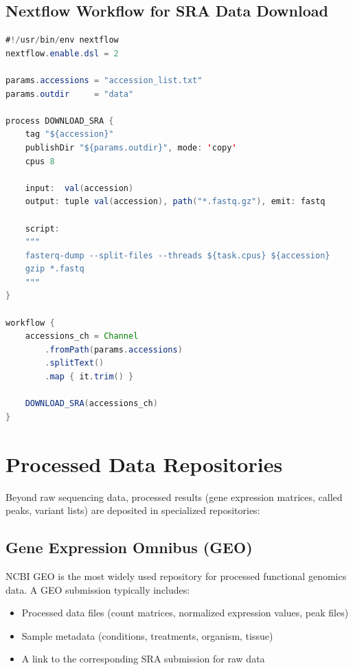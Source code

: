 \subsection{Nextflow Workflow for SRA Data Download}

\begin{lstlisting}[language=Java,caption={Nextflow process for downloading SRA data.},label=lst:nf-sra]
#!/usr/bin/env nextflow
nextflow.enable.dsl = 2

params.accessions = "accession_list.txt"
params.outdir     = "data"

process DOWNLOAD_SRA {
    tag "${accession}"
    publishDir "${params.outdir}", mode: 'copy'
    cpus 8

    input:  val(accession)
    output: tuple val(accession), path("*.fastq.gz"), emit: fastq

    script:
    """
    fasterq-dump --split-files --threads ${task.cpus} ${accession}
    gzip *.fastq
    """
}

workflow {
    accessions_ch = Channel
        .fromPath(params.accessions)
        .splitText()
        .map { it.trim() }

    DOWNLOAD_SRA(accessions_ch)
}
\end{lstlisting}

\section{Processed Data Repositories}
\label{sec:datastandards:processed}

Beyond raw sequencing data, processed results (gene expression matrices, called peaks, variant lists) are deposited in specialized repositories:

\subsection{Gene Expression Omnibus (GEO)}

NCBI GEO is the most widely used repository for processed functional genomics data. A GEO submission typically includes:
\begin{itemize}[nosep]
  \item Processed data files (count matrices, normalized expression values, peak files)
  \item Sample metadata (conditions, treatments, organism, tissue)
  \item A link to the corresponding SRA submission for raw data
\end{itemize}

